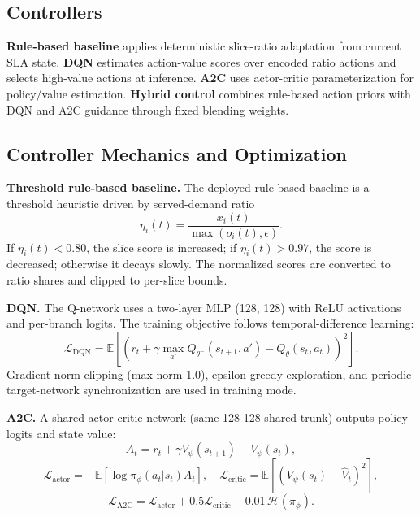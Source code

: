 \documentclass[journal]{IEEEtran}
\begin{document}
\subsection{Controllers}
\textbf{Rule-based baseline} applies deterministic slice-ratio adaptation from current SLA state. \textbf{DQN} estimates action-value scores over encoded ratio actions and selects high-value actions at inference. \textbf{A2C} uses actor-critic parameterization for policy/value estimation. \textbf{Hybrid control} combines rule-based action priors with DQN and A2C guidance through fixed blending weights.

\subsection{Controller Mechanics and Optimization}
\textbf{Threshold rule-based baseline.} The deployed rule-based baseline is a threshold heuristic driven by served-demand ratio
\begin{equation}
\eta_i(t)=\frac{x_i(t)}{\max(o_i(t),\epsilon)}.
\end{equation}
If \(\eta_i(t)<0.80\), the slice score is increased; if \(\eta_i(t)>0.97\), the score is decreased; otherwise it decays slowly. The normalized scores are converted to ratio shares and clipped to per-slice bounds.

\textbf{DQN.} The Q-network uses a two-layer MLP (128, 128) with ReLU activations and per-branch logits. The training objective follows temporal-difference learning:
\begin{equation}
\mathcal{L}_{\mathrm{DQN}}=\mathbb{E}\left[\left(r_t+\gamma\max_{a'}Q_{\theta^-}(s_{t+1},a')-Q_{\theta}(s_t,a_t)\right)^2\right].
\end{equation}
Gradient norm clipping (max norm 1.0), epsilon-greedy exploration, and periodic target-network synchronization are used in training mode.

\textbf{A2C.} A shared actor-critic network (same 128-128 shared trunk) outputs policy logits and state value:
\begin{equation}
A_t=r_t+\gamma V_{\psi}(s_{t+1})-V_{\psi}(s_t),
\end{equation}
\begin{equation}
\mathcal{L}_{\mathrm{actor}}=-\mathbb{E}[\log \pi_{\phi}(a_t|s_t)A_t],\quad
\mathcal{L}_{\mathrm{critic}}=\mathbb{E}\left[\left(V_{\psi}(s_t)-\hat V_t\right)^2\right],
\end{equation}
\begin{equation}
\mathcal{L}_{\mathrm{A2C}}=\mathcal{L}_{\mathrm{actor}}+0.5\mathcal{L}_{\mathrm{critic}}-0.01\,\mathcal{H}(\pi_{\phi}).
\end{equation}
\end{document}
